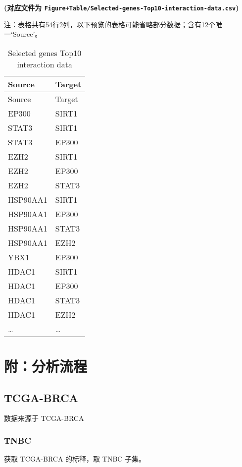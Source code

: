 \documentclass[
]{article}
\begin{document}
\textbf{(对应文件为 \texttt{Figure+Table/Selected-genes-Top10-interaction-data.csv})}

\begin{center}\begin{tcolorbox}[colback=gray!10, colframe=gray!50, width=0.9\linewidth, arc=1mm, boxrule=0.5pt]注：表格共有54行2列，以下预览的表格可能省略部分数据；含有12个唯一`Source'。
\end{tcolorbox}
\end{center}

\begin{longtable}[]{@{}ll@{}}
\caption{\label{tab:Selected-genes-Top10-interaction-data}Selected genes Top10 interaction data}\tabularnewline
\toprule
Source & Target\tabularnewline
\midrule
\endfirsthead
\toprule
Source & Target\tabularnewline
\midrule
\endhead
EP300 & SIRT1\tabularnewline
STAT3 & SIRT1\tabularnewline
STAT3 & EP300\tabularnewline
EZH2 & SIRT1\tabularnewline
EZH2 & EP300\tabularnewline
EZH2 & STAT3\tabularnewline
HSP90AA1 & SIRT1\tabularnewline
HSP90AA1 & EP300\tabularnewline
HSP90AA1 & STAT3\tabularnewline
HSP90AA1 & EZH2\tabularnewline
YBX1 & EP300\tabularnewline
HDAC1 & SIRT1\tabularnewline
HDAC1 & EP300\tabularnewline
HDAC1 & STAT3\tabularnewline
HDAC1 & EZH2\tabularnewline
\ldots{} & \ldots{}\tabularnewline
\bottomrule
\end{longtable}

\begin{center}\vspace{1.5cm}\end{center}

\hypertarget{workflow2}{%
\section{附：分析流程}\label{workflow2}}

\hypertarget{tcga-brca}{%
\subsection{TCGA-BRCA}\label{tcga-brca}}

数据来源于 TCGA-BRCA

\hypertarget{tnbc}{%
\subsubsection{TNBC}\label{tnbc}}

获取 TCGA-BRCA 的标释，取 TNBC 子集。
\end{document}
